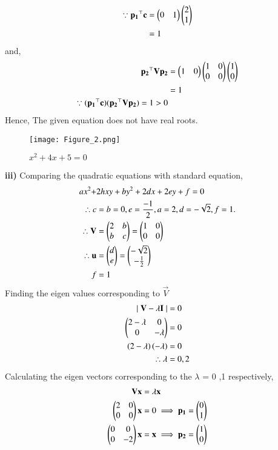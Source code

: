 \documentclass[journal,12pt,twocolumn]{IEEEtran}
\begin{document}
\begin{align}
    \because \mathbf{p_1}^{\top}\mathbf{c} &= \begin{pmatrix}0 & 1\end{pmatrix}\begin{pmatrix}2\\1\end{pmatrix} \\
    &= 1
\end{align}
and,
\begin{align}
    \mathbf{p_2}^{\top}\mathbf{V}\mathbf{p_2}&= \begin{pmatrix}1 & 0\end{pmatrix}\begin{pmatrix}1 & 0 \\ 0 & 0\end{pmatrix}\begin{pmatrix}1 \\ 0\end{pmatrix}\\
    &= 1\\
    \because (\mathbf{p_1}^{\top}\mathbf{c}) (\mathbf{p_2}^{\top}\mathbf{V}\mathbf{p_2})=1>0 
\end{align}
Hence, The given equation does not have real roots.\\
\begin{figure}[htp]
    \centering
    \texttt{[image: Figure\_2.png]}
    \caption{$x^2+4x+5=0$}
    \label{fig:my_label}
\end{figure}
\textbf{iii)}
Comparing the quadratic equations with standard equation,
\begin{align}
    ax^2+&2hxy+by^2+2dx+2ey+f=0\\
    \therefore c&=b=0,e=\frac{-1}{2}, a=2,d=-\sqrt{2},f=1.\\
    \therefore \mathbf{V}&=\begin{pmatrix}2 & b \\ b & c\end{pmatrix}=\begin{pmatrix}1 & 0 \\ 0 & 0\end{pmatrix}\\ \therefore \mathbf{u}&=\begin{pmatrix}d \\ e\end{pmatrix}= \begin{pmatrix}-\sqrt{2} \\ -\frac{1}{2}\end{pmatrix}\\ f&=1
\end{align}
Finding the eigen values corresponding to  $\vec{V}$
\begin{align}
    \mid \mathbf{V}- \lambda \mathbf{I} \mid &=0\\
    \begin{pmatrix} 2- \lambda & 0 \\ 0 & -\lambda\end{pmatrix}&=0\\
    \left(2 - \lambda\right)\left(-\lambda\right)&=0 \\
    \therefore \lambda &= 0 ,2
\end{align}
Calculating the eigen vectors corresponding to the $\lambda$ = 0 ,1 respectively,
\begin{align}
    \mathbf{V}\mathbf{x}&=\lambda\mathbf{x}\\
    \begin{pmatrix}2 & 0 \\ 0 & 0\end{pmatrix}\mathbf{x}&=0 \implies \mathbf{p_{1}}=\begin{pmatrix}0 \\1\end{pmatrix}\\
    \begin{pmatrix}0 & 0 \\ 0 & -2\end{pmatrix}\mathbf{x} &= \mathbf{x} \implies \mathbf{p_{2}}= \begin{pmatrix}1 \\ 0\end{pmatrix} 
\end{align}
\end{document}
